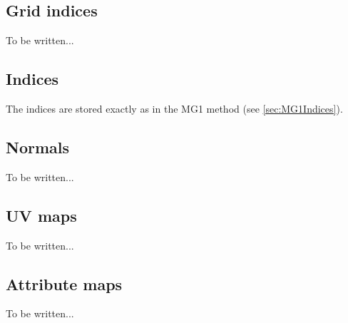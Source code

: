 \subsection{Grid indices}
To be written...

\subsection{Indices}
The indices are stored exactly as in the MG1 method (see \ref{sec:MG1Indices}).

\subsection{Normals}
To be written...

\subsection{UV maps}
To be written...

\subsection{Attribute maps}
To be written...


